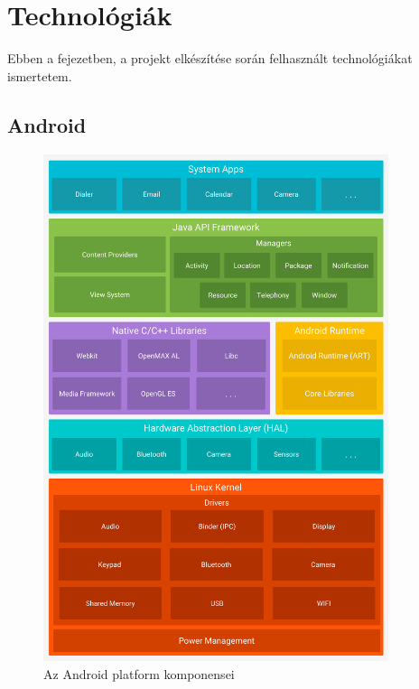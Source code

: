 
\chapter{Technológiák}

\begin{osszefoglal}
	Ebben a fejezetben, a projekt elkészítése során felhasznált technológiákat ismertetem.
	
\end{osszefoglal}

\section{Android}

\begin{figure}
	\centering
	\setlength{\abovecaptionskip}{0pt}
	\setlength{\belowcaptionskip}{0pt}
	\includegraphics[width=0.9\textwidth, scale=0.9]{images/android}
	\caption{Az Android platform komponensei\label{fig:ALAP:sm2}}
\end{figure}

